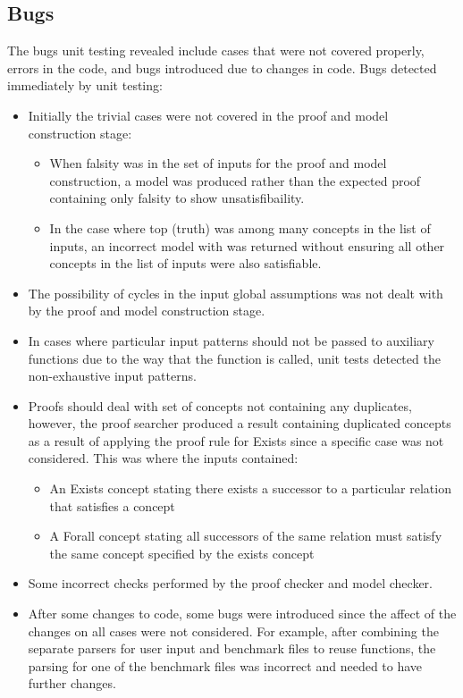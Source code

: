 \subsection*{Bugs}
The bugs unit testing revealed include cases that were not covered properly, errors in the code, and bugs introduced due to changes in code. Bugs detected immediately by unit testing:

\begin{itemize}
\item Initially the trivial cases were not covered in the proof and model construction stage:
  \begin{itemize}
    \item When falsity was in the set of inputs for the proof and model construction, a model was produced rather than the expected proof containing only falsity to show unsatisfibaility.
    \item In the case where top (truth) was among many concepts in the list of inputs, an incorrect model with was returned without ensuring all other concepts in the list of inputs were also satisfiable.
  \end{itemize}
\item The possibility of cycles in the input global assumptions was not dealt with by the proof and model construction stage.

\item In cases where particular input patterns should not be passed to auxiliary functions due to the way that the function is called, unit tests detected the non-exhaustive input patterns.

\item Proofs should deal with set of concepts not containing any duplicates, however, the proof searcher produced a result containing duplicated concepts as a result of applying the proof rule for Exists since a specific case was not considered. This was where the inputs contained:
  \begin{itemize}
    \item An Exists concept stating there exists a successor to a particular relation that satisfies a concept
    \item A Forall concept stating all successors of the same relation must satisfy the same concept specified by the exists concept
  \end{itemize}
\item Some incorrect checks performed by the proof checker and model checker.

\item After some changes to code, some bugs were introduced since the affect of the changes on all cases were not considered. For example, after combining the separate parsers for user input and benchmark files to reuse functions, the parsing for one of the benchmark files was incorrect and needed to have further changes. 
\end{itemize}
